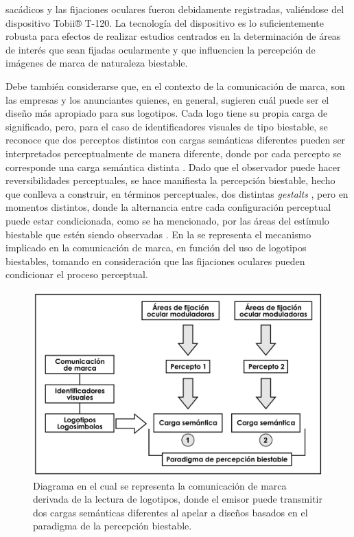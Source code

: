 \documentclass[spanish]{textolivre}
\begin{document}
sacádicos y las fijaciones oculares fueron debidamente registradas, valiéndose del dispositivo Tobii® T-120. La tecnología del dispositivo es lo suficientemente robusta para efectos de realizar estudios centrados en la determinación de áreas de interés que sean fijadas ocularmente y que influencien la percepción de imágenes de marca de naturaleza biestable.

Debe también considerarse que, en el contexto de la comunicación de marca, son las empresas y los anunciantes quienes, en general, sugieren cuál puede ser el diseño más apropiado para sus logotipos. Cada logo tiene su propia carga de significado, pero, para el caso de identificadores visuales de tipo biestable, se reconoce que dos perceptos distintos con cargas semánticas diferentes pueden ser interpretados perceptualmente de manera diferente, donde por cada percepto se corresponde una carga semántica distinta \cite{bernal_robayo_alisis_2020,rodriguez-martinez_can_2024}. Dado que el observador puede hacer reversibilidades perceptuales, se hace manifiesta la percepción biestable, hecho que conlleva a construir, en términos perceptuales, dos distintas \textit{gestalts} \cite{de-wit_bistable_2012}, pero en momentos distintos, donde la alternancia entre cada configuración perceptual puede estar condicionada, como se ha mencionado, por las áreas del estímulo biestable que estén siendo observadas \cite{myers_ambiguous_2022}. En la  se representa el mecanismo implicado en la comunicación de marca, en función del uso de logotipos biestables, tomando en consideración que las fijaciones oculares pueden condicionar el proceso perceptual.

\begin{figure}
\centering
\begin{minipage}{.75\textwidth}
    \centering
    \includegraphics[width=\linewidth]{Fig3.jpeg}
    \caption{Diagrama en el cual se representa la comunicación de marca derivada de la lectura de logotipos, donde el emisor puede transmitir dos cargas semánticas diferentes al apelar a diseños basados en el paradigma de la percepción biestable.}
    \label{fig3}
\end{minipage}
\end{figure}
\end{document}
